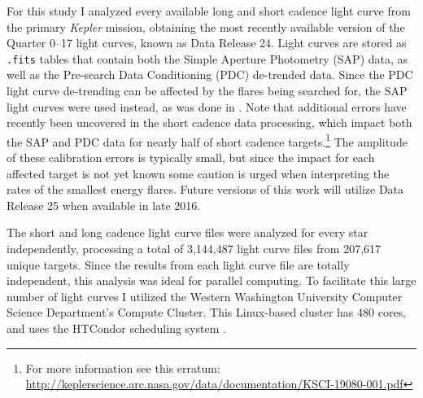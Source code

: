 \documentclass[twocolumn]{aastex6}
\newcommand{\Kepler}{\textsl{Kepler}\xspace}
\begin{document}
For this study I analyzed every available long and short cadence light curve from the primary \Kepler mission, obtaining the most recently available version of the Quarter 0--17 light curves, known as Data Release 24. Light curves are stored as {\tt .fits} tables that contain both the Simple Aperture Photometry (SAP) data, as well as the Pre-search Data Conditioning (PDC) de-trended data. Since the PDC light curve de-trending can be affected by the flares being searched for, the SAP light curves were used instead, as was done in \citet{balona2015}. Note that additional errors have recently been uncovered in the short cadence data processing, which impact both the SAP and PDC data for nearly half of short cadence targets.\footnote{For more information see this erratum:\\ \url{http://keplerscience.arc.nasa.gov/data/documentation/KSCI-19080-001.pdf}}
The amplitude of these calibration errors is typically small, but since the impact for each affected target is not yet known some caution is urged when interpreting the rates of the smallest energy flares. Future versions of this work will utilize Data Release 25 when available in late 2016.

The short and long cadence light curve files were analyzed for every star independently, processing a total of 3,144,487 light curve files from 207,617 unique targets. Since the results from each light curve file are totally independent, this analysis was ideal for parallel computing. To facilitate this large number of light curves I utilized the Western Washington University Computer Science Department's Compute Cluster. This Linux-based cluster has 480 cores, and uses the HTCondor scheduling system \citep{condor-hunter,condor-practice}.
\end{document}
